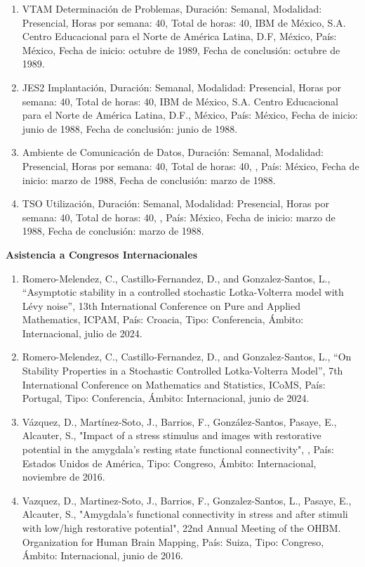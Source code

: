 \documentclass[12pt]{article}
\begin{document}
\begin{enumerate}
\item VTAM Determinación de Problemas, Duración: Semanal, Modalidad: Presencial, Horas por semana: 40, Total de horas: 40, IBM de 
México, 
S.A. Centro Educacional para el Norte de América Latina, D.F, México, País: México, Fecha de inicio: octubre de 1989, Fecha de 
conclusión: octubre de 1989.

\item JES2 Implantación, Duración: Semanal, Modalidad: Presencial, Horas por semana: 40, Total de horas: 40, IBM de México, S.A. Centro 
Educacional para el Norte de América Latina, D.F., México, País: México, Fecha de inicio: junio de 1988, Fecha de conclusión: junio de 
1988.

\item Ambiente de Comunicación de Datos, Duración: Semanal, Modalidad: Presencial, Horas por semana: 40, Total de horas: 40, , País: 
México, Fecha de inicio: marzo de 1988, Fecha de conclusión: marzo de 1988.

\item TSO Utilización, Duración: Semanal, Modalidad: Presencial, Horas por semana: 40, Total de horas: 40, , País: México, Fecha de 
inicio: marzo de 1988, Fecha de conclusión: marzo de 1988.
\end{enumerate}


\textbf{Asistencia a Congresos Internacionales}

\begin{enumerate}
\item Romero-Melendez, C., Castillo-Fernandez, D., and Gonzalez-Santos, L., “Asymptotic stability in a controlled stochastic 
Lotka-Volterra model with Lévy noise”, 13th International Conference on Pure and Applied Mathematics, ICPAM, País: Croacia, Tipo: 
Conferencia, Ámbito: Internacional, julio de 2024.

\item Romero-Melendez, C., Castillo-Fernandez, D., and Gonzalez-Santos, L., “On Stability Properties in a Stochastic Controlled 
Lotka-Volterra Model”, 7th International Conference on Mathematics and Statistics, ICoMS, País: Portugal, Tipo: Conferencia, Ámbito: 
Internacional, junio de 2024.

\item Vázquez, D., Martínez-Soto, J., Barrios, F., González-Santos, Pasaye, E., Alcauter, S., "Impact of a stress stimulus and images 
with 
restorative potential in the amygdala's resting state functional connectivity", , País: Estados Unidos de América, Tipo: Congreso, 
Ámbito: Internacional, noviembre de 2016.

\item Vazquez, D., Martinez-Soto, J., Barrios, F., Gonzalez-Santos, L., Pasaye, E., Alcauter, S., "Amygdala's functional connectivity 
in 
stress and after stimuli with low/high restorative potential", 22nd Annual Meeting of the OHBM. Organization for Human Brain Mapping, 
País: Suiza, Tipo: Congreso, Ámbito: Internacional, junio de 2016.
\end{enumerate}
\end{document}
